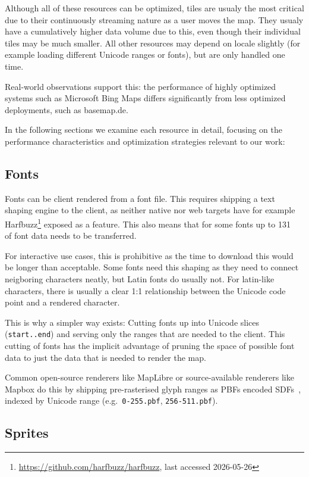Although all of these resources can be optimized, tiles are usualy the most critical due to their continuously streaming nature as a user moves the map.
They usualy have a cumulatively higher data volume due to this, even though their individual tiles may be much smaller.
All other resources may depend on locale slightly (for example loading different Unicode ranges or fonts), but are only handled one time.

Real-world observations support this:
the performance of highly optimized systems such as Microsoft Bing Maps differs significantly from less optimized deployments, such as basemap.de.

In the following sections we examine each resource in detail, focusing on the performance characteristics and optimization strategies relevant to our work:

\subsection{Fonts}

Fonts can be client rendered from a font file.
This requires shipping a text shaping engine to the client, as neither native nor web targets have for example Harfbuzz\footnote{\url{https://github.com/harfbuzz/harfbuzz}, last accessed 2026-05-26} exposed as a feature.
This also means that for some fonts up to \qty{131}{\mega\byte}\cite{FontThatIncludes} of font data needs to be transferred.

For interactive use cases, this is prohibitive as the time to download this would be longer than acceptable.
Some fonts need this shaping as they need to connect neigboring characters neatly, but Latin fonts do usually not.
For latin-like characters, there is usually a clear 1:1 relationship between the Unicode code point and a rendered character.

This is why a simpler way exists:
Cutting fonts up into Unicode slices (\texttt{start..end}) and serving only the ranges that are needed to the client.
This cutting of fonts has the implicit advantage of pruning the space of possible font data to just the data that is needed to render the map.

Common open-source renderers like MapLibre or source-available renderers like Mapbox do this by shipping pre-rasterised glyph ranges as \acp{PBF} encoded \acp{SDF}~\cite{greenImprovedAlphatestedMagnification2007}, indexed by Unicode range (e.g.\ \texttt{0-255.pbf}, \texttt{256-511.pbf}).

\subsection{Sprites}

